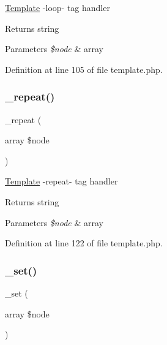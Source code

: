 \hyperlink{class_template}{Template} -\/loop-\/ tag handler \begin{DoxyReturn}{Returns}
string 
\end{DoxyReturn}

\begin{DoxyParams}{Parameters}
{\em \$node} & array \\
\hline
\end{DoxyParams}


Definition at line 105 of file template.\+php.

\hypertarget{class_template_a39819dbd44517f7266ef5e39bcc37751}{}\label{class_template_a39819dbd44517f7266ef5e39bcc37751} 
\subsubsection{\texorpdfstring{\+\_\+repeat()}{\_repeat()}}
{\footnotesize\ttfamily \+\_\+repeat (\begin{DoxyParamCaption}\item[{array}]{\$node }\end{DoxyParamCaption})\hspace{0.3cm}{\ttfamily [protected]}}

\hyperlink{class_template}{Template} -\/repeat-\/ tag handler \begin{DoxyReturn}{Returns}
string 
\end{DoxyReturn}

\begin{DoxyParams}{Parameters}
{\em \$node} & array \\
\hline
\end{DoxyParams}


Definition at line 122 of file template.\+php.

\hypertarget{class_template_a38478c9981f9204a5f7a8ebe9c2e0f1f}{}\label{class_template_a38478c9981f9204a5f7a8ebe9c2e0f1f} 
\subsubsection{\texorpdfstring{\+\_\+set()}{\_set()}}
{\footnotesize\ttfamily \+\_\+set (\begin{DoxyParamCaption}\item[{array}]{\$node }\end{DoxyParamCaption})\hspace{0.3cm}{\ttfamily [protected]}}

